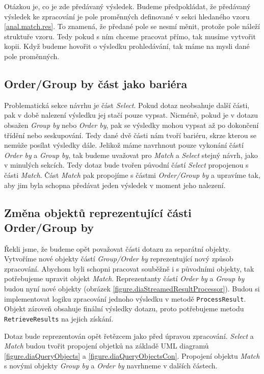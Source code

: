 Otázkou je, co je zde předávaný výsledek.
Budeme předpokládat, že předávaný výsledek ke zpracování je pole proměnných definované v sekci hledaného vzoru \ref{anal.match.res}.
To znamená, že předané pole se nesmí měnit, protože pole náleží struktuře vzoru.
Tedy pokud s ním chceme pracovat přímo, tak musíme vytvořit kopii.
Když budeme hovořit o výsledku prohledávání, tak máme na mysli dané pole proměnných.

\subsection{Order/Group by část jako bariéra}

Problematická sekce návrhu je část \textit{Select}.
Pokud dotaz neobsahuje další části, pak v době nalezení výsledku jej stačí pouze vypsat.
Nicméně, pokud je v dotazu obsažen \textit{Group by} nebo \textit{Order by}, pak se výsledky mohou vypsat až po dokončení třídění nebo seskupování.
Tedy dané dvě části nám tvoří bariéru, skrze kterou se nemůže posílat výsledky dále.
Jelikož máme navrhnout pouze vykonání částí \textit{Order by} a \textit{Group by}, tak budeme uvažovat pro \textit{Match} a \textit{Select} stejný návrh, jako v minulých sekcích.
Tedy dotaz bude tvořen původní částí \textit{Select} propojenou s části \textit{Match}.
Část \textit{Match} pak propojíme s částmi \textit{Order/Group by} a upravíme tak, aby jim byla schopna předávat jeden výsledek v moment jeho nalezení.  

\subsection{Změna objektů reprezentující části Order/Group by}

Řekli jsme, že budeme opět považovat části dotazu za separátní objekty.
Vytvoříme nové objekty částí \textit{Group/Order by} reprezentující nový způsob zpracování.
Abychom byli schopni pracovat souběžně i s původními objekty, tak potřebujeme upravit objekt \textit{Match}.
Reprezentanty částí \textit{Order by} a \textit{Group by} budou nyní nové objekty (obrázek \ref{figure.diaStreamedResultProcessor}).
Budou si implementovat logiku zpracování jednoho výsledku v metodě \texttt{ProcessResult}.
Objekt zároveň obsahuje finální výsledky dotazu, proto potřebujeme metodu \texttt{RetrieveResults} na jejich získání.

Dotaz bude reprezentován opět řetězcem jako před úpravou zpracování.
\textit{Select} a \textit{Match} budou tvořit propojení objetků na základě UML diagramů \ref{figure.diaQueryObjects} a \ref{figure.diaQueryObjectsCon}.
Propojení objektu \textit{Match} s novými objekty \textit{Group by} a \textit{Order by} navrhneme v dalších částech.

